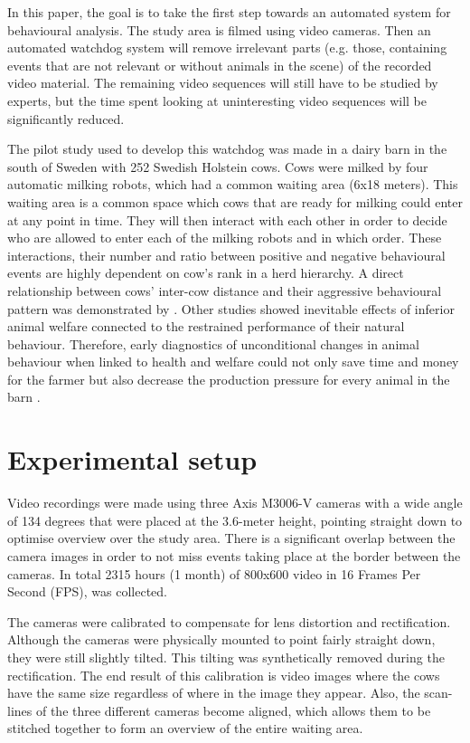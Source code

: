 \documentclass[10pt,a4paper,twocolumn]{article}
\begin{document}
In this paper, the goal is to take the first step towards an automated system for behavioural analysis. The study area is filmed using video cameras. Then an automated watchdog system will remove irrelevant parts (e.g. those, containing events that are not relevant or without animals in the scene) of the recorded video material. The remaining video sequences will still have to be studied by experts, but the time spent looking at uninteresting video sequences will be significantly reduced.

The pilot study used to develop this watchdog was made in a dairy barn in the south of Sweden with 252 Swedish Holstein cows. Cows were milked by four automatic milking robots, which had a common waiting area (6x18 meters). This waiting area is a common space which cows that are ready for milking could enter at any point in time. They will then interact with each other  in order to decide who are allowed to enter each of the milking robots and in which order. These interactions, their number and ratio between positive and negative behavioural events are highly dependent on cow's rank in a herd hierarchy. A direct relationship between cows' inter-cow distance and their aggressive behavioural pattern was demonstrated by \cite{DeVriesetal2004}. Other studies \cite{Hemsworth2003, Kilgour2012)} showed inevitable effects of inferior animal welfare connected to the restrained performance of their natural behaviour. Therefore, early diagnostics of unconditional changes in animal behaviour when linked to health and welfare could not only save time and money for the farmer but also decrease the production pressure for every animal in the barn \cite{Polikarpusetal2015}.


\section{Experimental setup}

Video recordings were made using three Axis M3006-V cameras with a wide angle of 134 degrees that were placed at the 3.6-meter height, pointing straight down to optimise overview over the study area. There is a significant overlap between the camera images in order to not miss events taking place at the border between the cameras. In total 2315 hours (1 month) of 800x600 video in 16 Frames Per Second (FPS), was collected.

The cameras were calibrated to compensate for lens distortion and rectification. Although the cameras were physically mounted to point fairly straight down, they were still slightly tilted. This tilting was synthetically removed during the rectification. The end result of this calibration is video images where the cows have the same size regardless of where in the image they appear. Also, the scan-lines of the three different cameras become aligned, which allows them to be stitched together to form an overview of the entire waiting area.
\end{document}
